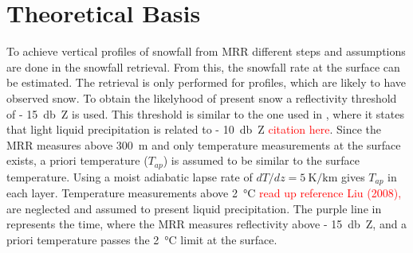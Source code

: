 \section{Theoretical Basis}\label{sec:ret_th}
To achieve vertical profiles of snowfall from MRR different steps and assumptions are done in the snowfall retrieval. From this, the snowfall rate at the surface can be estimated. The retrieval is only performed for profiles, which are likely to have observed snow. To obtain the likelyhood of present snow a reflectivity threshold of \SI{- 15}{\decibel Z} is used. This threshold is similar to the one used in \cite{wood_level_2013}, where it states that light liquid precipitation is related to \SI{- 10}{\decibel Z} \textcolor{red}{citation here}. 
Since the MRR measures above \SI{300}{\metre} and only temperature measurements at the surface exists, a priori temperature ($T_{ap}$) is assumed to be similar to the surface temperature. Using a moist adiabatic lapse rate of $dT/dz = \SI{5}{\kelvin\per\km}$ gives $T_{ap}$ in each layer. Temperature measurements above \SI{2}{\celsius} \textcolor{red}{read up reference Liu (2008), \cite{wood_level_2013}} are neglected and assumed to present liquid precipitation. 
The purple line in  represents the time, where the MRR measures reflectivity above \SI{- 15}{\decibel Z}, and a priori temperature passes the \SI{2}{\celsius} limit at the surface.  


